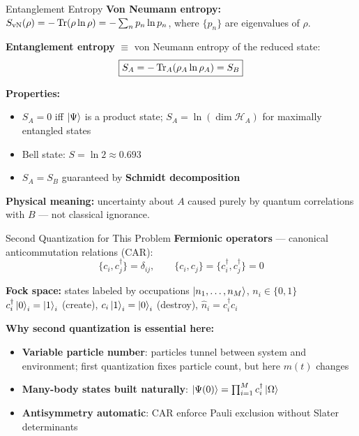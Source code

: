 \documentclass[aspectratio=169,11pt]{beamer}
\begin{document}
\begin{frame}{Entanglement Entropy}
\small
    \textbf{Von Neumann entropy:} $S_{\mathrm{vN}}(\rho) = -\Tr(\rho \ln \rho) = -\sum_n p_n \ln p_n$, where $\{p_n\}$ are eigenvalues of $\rho$.

    \textbf{Entanglement entropy} $\equiv$ von Neumann entropy of the reduced state:
    \[
        \boxed{S_A = -\Tr_A(\rho_A \ln \rho_A) = S_B}
    \]

    \textbf{Properties:}
    \begin{itemize}\setlength{\itemsep}{1pt}
        \item $S_A = 0$ iff $\ket{\Psi}$ is a product state; $S_A = \ln(\dim\mathcal{H}_A)$ for maximally entangled states
        \item Bell state: $S = \ln 2 \approx 0.693$
        \item $S_A = S_B$ guaranteed by \textbf{Schmidt decomposition}
    \end{itemize}

    \textbf{Physical meaning:} uncertainty about $A$ caused purely by quantum correlations with $B$ --- not classical ignorance.
\end{frame}

\begin{frame}{Second Quantization for This Problem}
\small
    \textbf{Fermionic operators} --- canonical anticommutation relations (CAR):
    \[
        \{c_i,c_j^\dagger\}=\delta_{ij},\qquad \{c_i,c_j\}=\{c_i^\dagger,c_j^\dagger\}=0
    \]

    \vspace{-0.1cm}
    \textbf{Fock space:} states labeled by occupations $\ket{n_1, \ldots, n_M}$, $n_i\in\{0,1\}$\\[2pt]
    $c_i^\dagger\ket{0}_i = \ket{1}_i$ (create), \; $c_i\ket{1}_i = \ket{0}_i$ (destroy), \; $\hat{n}_i = c_i^\dagger c_i$

    \vspace{0.15cm}
    \textbf{Why second quantization is essential here:}
    \begin{itemize}\setlength{\itemsep}{2pt}
        \item \textbf{Variable particle number}: particles tunnel between system and environment; first quantization fixes particle count, but here $m(t)$ changes
        \item \textbf{Many-body states built naturally}: $\ket{\Psi(0)} = \prod_{i=1}^M c_i^\dagger\ket{\Omega}$
        \item \textbf{Antisymmetry automatic}: CAR enforce Pauli exclusion without Slater determinants
    \end{itemize}
\end{frame}
\end{document}
